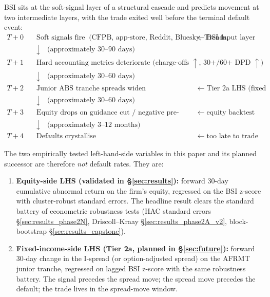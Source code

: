 \documentclass[11pt,a4paper]{article}
\begin{document}
BSI sits at the soft-signal layer of a structural cascade and predicts movement at two intermediate layers, with the trade exited well before the terminal default event:
\begin{align*}
T+0  &\quad \text{Soft signals fire}\;\;\text{(CFPB, app-store, Reddit, Bluesky, Trends, ABS, 8-K)} && \leftarrow\;\text{BSI input layer}\\
     &\quad\downarrow\quad \text{(approximately 30--90 days)} \\
T+1  &\quad \text{Hard accounting metrics deteriorate (charge-offs $\uparrow$, 30+/60+ DPD $\uparrow$)} \\
     &\quad\downarrow\quad \text{(approximately 30--60 days)} \\
T+2  &\quad \text{Junior ABS tranche spreads widen} && \leftarrow\;\text{Tier 2a LHS (fixed income)}\\
     &\quad\downarrow\quad \text{(approximately 30--60 days)} \\
T+3  &\quad \text{Equity drops on guidance cut / negative pre-announcement} && \leftarrow\;\text{equity backtest LHS}\\
     &\quad\downarrow\quad \text{(approximately 3--12 months)} \\
T+4  &\quad \text{Defaults crystallise} && \leftarrow\;\text{too late to trade}
\end{align*}

The two empirically tested left-hand-side variables in this paper and its planned successor are therefore \emph{not} default rates. They are:
\begin{enumerate}
\item \textbf{Equity-side LHS (validated in §\ref{sec:results}):} forward 30-day cumulative abnormal return on the firm's equity, regressed on the BSI z-score with cluster-robust standard errors. The headline result clears the standard battery of econometric robustness tests (HAC standard errors §\ref{sec:results_phase2N}, Driscoll--Kraay §\ref{sec:results_phase2A_v2}, block-bootstrap §\ref{sec:results_capstone}).
\item \textbf{Fixed-income-side LHS (Tier 2a, planned in §\ref{sec:future}):} forward 30-day change in the I-spread (or option-adjusted spread) on the AFRMT junior tranche, regressed on lagged BSI z-score with the same robustness battery. The signal precedes the spread move; the spread move precedes the default; the trade lives in the spread-move window.
\end{enumerate}
\end{document}
